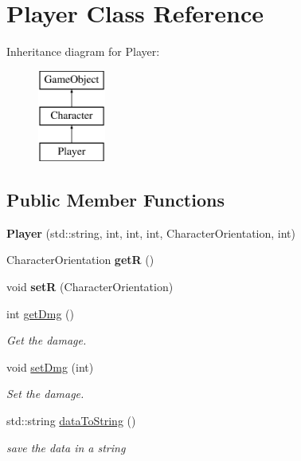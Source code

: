 \hypertarget{class_player}{}\section{Player Class Reference}
\label{class_player}
Inheritance diagram for Player\+:\begin{figure}[H]
\begin{center}
\leavevmode
\includegraphics[height=3.000000cm]{class_player}
\end{center}
\end{figure}
\subsection*{Public Member Functions}
\begin{DoxyCompactItemize}
\item 
\mbox{\label{class_player_a8b76b277ae15eced5d10f59778f8b433}} 
{\bfseries Player} (std\+::string, int, int, int, Character\+Orientation, int)
\item 
\mbox{\label{class_player_abefafc33ac811944c7cac447ac394917}} 
Character\+Orientation {\bfseries getR} ()
\item 
\mbox{\label{class_player_a54836e99012d8345473841d779aea6d3}} 
void {\bfseries setR} (Character\+Orientation)
\item 
\mbox{\label{class_player_a79a5063d16b6d4211fb0653c7d7237da}} 
int \mbox{\hyperlink{class_player_a79a5063d16b6d4211fb0653c7d7237da}{get\+Dmg}} ()
\begin{DoxyCompactList}\small\item\em Get the damage. \end{DoxyCompactList}\item 
\mbox{\label{class_player_a2a18f620b031c8a0d7e0e0fcc66899bd}} 
void \mbox{\hyperlink{class_player_a2a18f620b031c8a0d7e0e0fcc66899bd}{set\+Dmg}} (int)
\begin{DoxyCompactList}\small\item\em Set the damage. \end{DoxyCompactList}\item 
std\+::string \mbox{\hyperlink{class_player_a3bd5a8ec31a4c46b09c4d9642e8d65ee}{data\+To\+String}} ()
\begin{DoxyCompactList}\small\item\em save the data in a string \end{DoxyCompactList}\end{DoxyCompactItemize}


